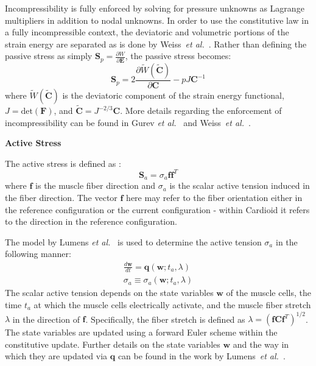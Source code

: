 Incompressibility is fully enforced by solving for pressure unknowns as Lagrange multipliers in addition to nodal unknowns. In order to use the constitutive law in a fully incompressible context, the deviatoric and volumetric portions of the strain energy are separated as is done by Weiss~\textit{et al.}~\cite{weiss_1996}. Rather than defining the passive stress as simply $\bm{S}_p = \frac{\partial W}{\partial \bm{E}}$, the passive stress becomes:
\begin{equation}
\bm{S}_p= 2\frac{\partial{\tilde{W}(\tilde{\bm{C}})}}{\partial{\bm{C}}} - pJ\bm{C}^{-1}
\end{equation}
where $\tilde{W}(\tilde{\bm{C}})$ is the deviatoric component of the strain energy functional, $J = \text{det}(\bm{F})$, and $\tilde{\bm{C}} = J^{-2/3}\bm{C}$. More details regarding the enforcement of incompressibility can be found in Gurev \textit{et al.}~\cite{gurev_2015} and Weiss~\textit{et al.}~\cite{weiss_1996}.

\textbf{Active Stress}

The active stress is defined as :
\begin{equation}
\bm{S}_a = \sigma_a \bm{f} \bm{f}^{T}
\label{eqn:active}
\end{equation}
where $\bm{f}$ is the muscle fiber direction and ${\sigma_a}$ is the scalar active tension induced in the fiber direction. The vector $\bm{f}$ here may refer to the fiber orientation either in the reference configuration or the current configuration - within Cardioid it refers to the direction in the reference configuration.

The model by Lumens \textit{et al.}~\cite{lumens_2009} is used to determine the active tension $\sigma_a$ in the following manner:
\begin{align}
\frac{d\bm{w}}{dt} = \bm{q}(\bm{w}; t_a, \lambda) \\
\sigma_a \equiv \sigma_a(\bm{w}; t_a, \lambda)
\end{align}
The scalar active tension depends on the state variables $\bm{w}$ of the muscle cells, the time $t_a$ at which the muscle cells electrically activate, and the muscle fiber stretch $\lambda$ in the direction of $\bm{f}$. Specifically, the fiber stretch is defined as $\lambda = (\bm{f}\bm{C}\bm{f}^T)^{1/2}$. The state variables are updated using a forward Euler scheme within the constitutive update. Further details on the state variables $\bm{w}$ and the way in which they are updated via $\bm{q}$ can be found in the work by Lumens~\textit{et al.}~\cite{lumens_2009}.

